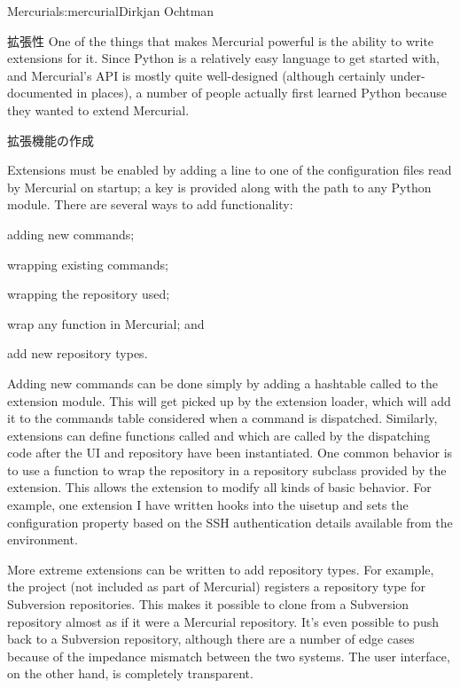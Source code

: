 \begin{aosachapter}{Mercurial}{s:mercurial}{Dirkjan Ochtman}
\begin{aosasect1}{拡張性}
One of the things that makes Mercurial powerful is the ability to
write extensions for it. Since Python is a relatively easy language to
get started with, and Mercurial's API is mostly quite well-designed
(although certainly under-documented in places), a number of people
actually first learned Python because they wanted to extend Mercurial.

\begin{aosasect2}{拡張機能の作成}

Extensions must be enabled by adding a line to one of the
configuration files read by Mercurial on startup; a key is provided
along with the path to any Python module. There are several ways to
add functionality:

\begin{aosaitemize}

  \item adding new commands;

  \item wrapping existing commands;

  \item wrapping the repository used;

  \item wrap any function in Mercurial; and

  \item add new repository types.

\end{aosaitemize}

Adding new commands can be done simply by adding a hashtable called
 to the extension module. This will get picked up by
the extension loader, which will add it to the commands table
considered when a command is dispatched. Similarly, extensions can
define functions called  and  which are
called by the dispatching code after the UI and repository have been
instantiated. One common behavior is to use a 
function to wrap the repository in a repository subclass provided by
the extension. This allows the extension to modify all kinds of basic
behavior. For example, one extension I have written hooks into the
uisetup and sets the  configuration property based on the
SSH authentication details available from the environment.

More extreme extensions can be written to add repository types. For
example, the  project (not included as part of
Mercurial) registers a repository type for Subversion
repositories. This makes it possible to clone from a Subversion
repository almost as if it were a Mercurial repository. It's even
possible to push back to a Subversion repository, although there are a
number of edge cases because of the impedance mismatch between the two
systems. The user interface, on the other hand, is completely
transparent.


\end{aosasect2}
\end{aosasect1}
\end{aosachapter}
